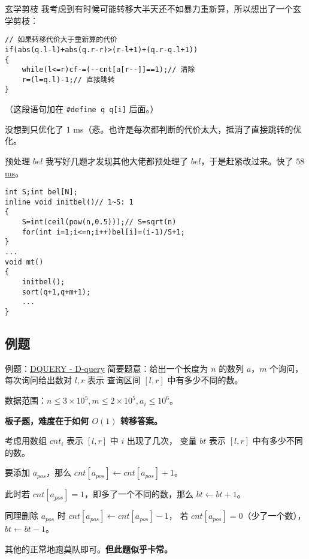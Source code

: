 \documentclass[table]{beamer}
\begin{document}
\begin{frame}[fragile]{玄学剪枝}
	我考虑到有时候可能转移大半天还不如暴力重新算，所以想出了一个玄学剪枝：
	\begin{verbatim}
// 如果转移代价大于重新算的代价
if(abs(q.l-l)+abs(q.r-r)>(r-l+1)+(q.r-q.l+1))
{
    while(l<=r)cf-=(--cnt[a[r--]]==1);// 清除
    r=(l=q.l)-1;// 直接跳转
}
\end{verbatim}
	（这段语句加在 \verb|#define q q[i]| 后面。）

	没想到只优化了 $1$ ms（悲。也许是每次都判断的代价太大，抵消了直接跳转的优化。
\end{frame}

\begin{frame}[fragile]{预处理 $bel$}
	我写好几题才发现其他大佬都预处理了 $bel$，于是赶紧改过来。快了 \href{https://www.luogu.com.cn/record/138365971}{\color{blue}$58$ ms}。
	\small
\begin{verbatim}
int S;int bel[N];
inline void initbel()// 1~S: 1
{
    S=int(ceil(pow(n,0.5)));// S=sqrt(n)
    for(int i=1;i<=n;i++)bel[i]=(i-1)/S+1;
}
...
void mt()
{
    initbel();
    sort(q+1,q+m+1);
    ...
}
\end{verbatim}
\end{frame}

\subsection{例题}

\begin{frame}
{例题：{\color{blue}\href{https://www.luogu.com.cn/problem/SP3267}{DQUERY - D-query}}}
	简要题意：给出一个长度为 $n$ 的数列 $a$，$m$ 个询问，每次询问给出数对 $l,r$ 表示
	查询区间 $[l,r]$ 中有多少不同的数。

	数据范围：$n\le 3\times10^5,m\le2\times10^5,a_i\le10^6$。
	\pause

	\textbf{板子题，难度在于如何 $O(1)$ 转移答案。}
	\pause

	考虑用数组 $cnt_i$ 表示 $[l,r]$ 中 $i$ 出现了几次，
	变量 $bt$ 表示 $[l,r]$ 中有多少不同的数。
	
	要添加 $a_{pos}$，那么 $cnt[a_{pos}]\gets cnt[a_{pos}]+1$。

	此时若 $cnt[a_{pos}]=1$，即多了一个不同的数，那么 $bt\gets bt+1$。

	同理删除 $a_{pos}$ 时 $cnt[a_{pos}]\gets cnt[a_{pos}]-1$，
	若 $cnt[a_{pos}]=0$（少了一个数），$bt\gets bt-1$。

	其他的正常地跑莫队即可。\textbf{但此题似乎卡常。}
\end{frame}
\end{document}
